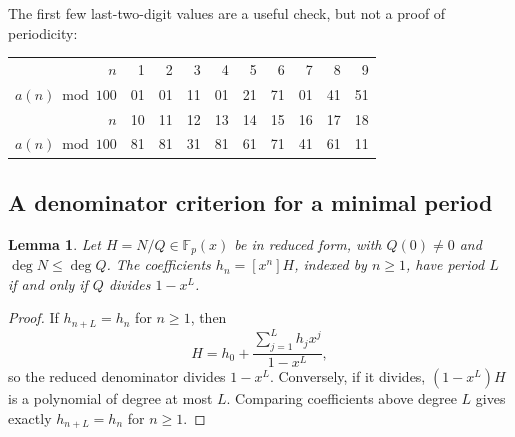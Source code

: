 \documentclass[11pt,letterpaper]{article}
\newtheorem{lemma}[theorem]{Lemma}
\theoremstyle{definition}
\theoremstyle{remark}
\newcommand{\F}{\mathbb F}
\newcommand{\coeff}[1]{[x^{#1}]}
\begin{document}
The first few last-two-digit values are a useful check, but not a proof
of periodicity:
\begin{center}
\begin{tabular}{@{}rrrrrrrrrr@{}}
\toprule
$n$&1&2&3&4&5&6&7&8&9\\
$a(n)\bmod100$&01&01&11&01&21&71&01&41&51\\
\midrule
$n$&10&11&12&13&14&15&16&17&18\\
$a(n)\bmod100$&81&81&31&81&61&71&41&61&11\\
\bottomrule
\end{tabular}
\end{center}

\subsection{A denominator criterion for a minimal period}
\begin{lemma}\label{lem:periodcriterion}
Let $H=N/Q\in\F_p(x)$ be in reduced form, with $Q(0)\ne0$ and
$\deg N\leq\deg Q$.  The coefficients $h_n=\coeff{n}H$, indexed by
$n\geq1$, have period $L$ if and only if $Q$ divides $1-x^L$.
\end{lemma}
\begin{proof}
If $h_{n+L}=h_n$ for $n\geq1$, then
\[
 H=h_0+\frac{\sum_{j=1}^Lh_jx^j}{1-x^L},
\]
so the reduced denominator divides $1-x^L$.
Conversely, if it divides, $(1-x^L)H$ is a polynomial of degree at most
$L$.  Comparing coefficients above degree $L$ gives exactly
$h_{n+L}=h_n$ for $n\geq1$.
\end{proof}
\end{document}
